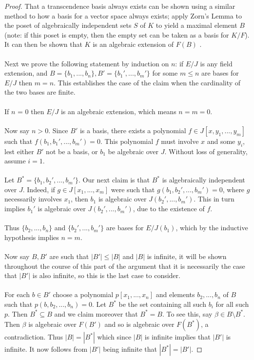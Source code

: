 \documentclass[12pt]{article}
\theoremstyle{plain}
\theoremstyle{definition}
\begin{document}
	\begin{proof}
		That a transcendence basis always exists can be shown using a similar method to how a basis for a vector space always exists; apply Zorn's Lemma to the poset of algebraically independent sets $S$ of $K$ to yield a maximal element $B$ (note: if this poset is empty, then the empty set can be taken as a basis for $K/F$). It can then be shown that $K$ is an algebraic extension of $F(B)$ \cite[\S 9.26]{stacksproject}.\\\\
		Next we prove the following statement by induction on $n$: if $E/J$ is any field extension, and $B = \lbrace b_1,...,b_n\rbrace,B' = \lbrace b_1',...,b_m'\rbrace$ for some $m \leq n$ are bases for $E/J$ then $m=n$. This establishes the case of the claim when the cardinality of the two bases are finite.\\\\
		If $n$ = 0 then $E/J$ is an algebraic extension, which means $n = m = 0$.\\\\
		Now say $n > 0$. Since $B'$ is a basis, there exists a polynomial $f \in J[x,y_1,...,y_m]$ such that $f(b_1,b_1',...,b_m') = 0$. This polynomial $f$ must involve $x$ and some $y_i$, lest either $B'$ not be a basis, or $b_1$ be algebraic over $J$. Without loss of generality, assume $i = 1$.\\\\
		Let $B^* = \lbrace b_1,b_2',...,b_m'\rbrace$. Our next claim is that $B^*$ is algebraically independent over $J$. Indeed, if $g \in J[x_1,...,x_m]$ were such that $g(b_1,b_2',...,b_m') = 0$, where $g$ necessarily involves $x_1$, then $b_1$ is algebraic over $J(b_2',...,b_m')$. This in turn implies $b_1'$ is algebraic over $J(b_2',...,b_m')$, due to the existence of $f$.\\\\
		Thus $\lbrace b_2,...,b_n\rbrace$ and $\lbrace b_2',...,b_m'\rbrace$ are bases for $E/J(b_1)$, which by the inductive hypothesis implies $n = m$.\\\\
		Now say $B,B'$ are such that $|B'| \leq |B|$ and $|B|$ is infinite, it will be shown throughout the course of this part of the argument that it is necessarily the case that $|B'|$ is also infinite, so this is the last case to consider.\\\\
		For each $b \in B'$ choose a polynomial $p[x_1,...,x_n]$ and elements $b_2,...,b_n$ of $B$ such that $p(b,b_2,...,b_n) = 0$. Let $B^\ast$ be the set containing all such $b_i$ for all such $p$. Then $B^\ast \subseteq B$ and we claim moreover that $B^\ast = B$. To see this, say $\beta \in B\setminus B^\ast$. Then $\beta$ is algebraic over $F(B')$ and so is algebraic over $F(B^\ast)$, a contradiction. Thus $|B| = |B^\ast|$ which since $|B|$ is infinite implies that $|B'|$ is infinite. It now follows from $|B'|$ being infinite that $|B^*| = |B'|$.
	\end{proof}
\end{document}
